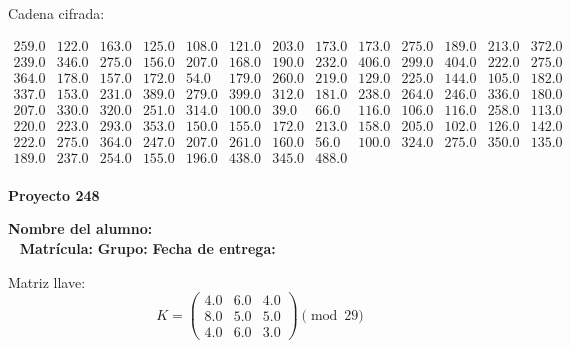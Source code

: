 \documentclass[12pt]{article}
\begin{document}
Cadena cifrada:
\begin{center}
$\begin{array}{lllllllllllll}
259.0 & 122.0 & 163.0 & 125.0 & 108.0 & 121.0 & 203.0 & 173.0 & 173.0 & 275.0 & 189.0 & 213.0 & 372.0\\
239.0 & 346.0 & 275.0 & 156.0 & 207.0 & 168.0 & 190.0 & 232.0 & 406.0 & 299.0 & 404.0 & 222.0 & 275.0\\
364.0 & 178.0 & 157.0 & 172.0 & 54.0 & 179.0 & 260.0 & 219.0 & 129.0 & 225.0 & 144.0 & 105.0 & 182.0\\
337.0 & 153.0 & 231.0 & 389.0 & 279.0 & 399.0 & 312.0 & 181.0 & 238.0 & 264.0 & 246.0 & 336.0 & 180.0\\
207.0 & 330.0 & 320.0 & 251.0 & 314.0 & 100.0 & 39.0 & 66.0 & 116.0 & 106.0 & 116.0 & 258.0 & 113.0\\
220.0 & 223.0 & 293.0 & 353.0 & 150.0 & 155.0 & 172.0 & 213.0 & 158.0 & 205.0 & 102.0 & 126.0 & 142.0\\
222.0 & 275.0 & 364.0 & 247.0 & 207.0 & 261.0 & 160.0 & 56.0 & 100.0 & 324.0 & 275.0 & 350.0 & 135.0\\
189.0 & 237.0 & 254.0 & 155.0 & 196.0 & 438.0 & 345.0 & 488.0\\
\end{array}$
\end{center}

\newpage


\textbf{Proyecto 248}

\textbf{Nombre del alumno:} \underline{\hspace{13cm}}\\\
\vspace{1cm}
\textbf{Matrícula:} \underline{\hspace{4cm}} \hspace{1cm}
\textbf{Grupo:} \underline{\hspace{2cm}}
\textbf{Fecha de entrega:} \underline{\hspace{2cm}}

\medskip

Matriz llave:
\[
K = \begin{pmatrix}
4.0 & 6.0 & 4.0\\
8.0 & 5.0 & 5.0\\
4.0 & 6.0 & 3.0
\end{pmatrix} \pmod{29}
\]
\end{document}
